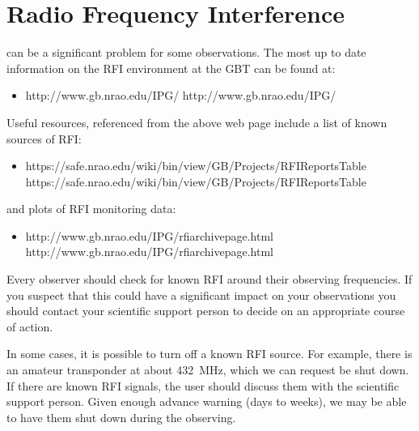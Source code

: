 \chapter{Radio Frequency Interference}\label{chap:rfi}

 can be a significant problem for some observations. The most
up to date information on the \gls{RFI} environment at the \gls{GBT} can be
found at:
\begin{itemize}
\item \htmladdnormallink
{http://www.gb.nrao.edu/IPG/}
{http://www.gb.nrao.edu/IPG/}
\end{itemize}

\noindent Useful resources, referenced from the above web page include
a list of known sources of \gls{RFI}: 
\begin{itemize}
\item \htmladdnormallink
{https://safe.nrao.edu/wiki/bin/view/GB/Projects/RFIReportsTable}
{https://safe.nrao.edu/wiki/bin/view/GB/Projects/RFIReportsTable}
\end{itemize}

\noindent and plots of RFI monitoring data:
\begin{itemize}
\item \htmladdnormallink
{http://www.gb.nrao.edu/IPG/rfiarchivepage.html}
{http://www.gb.nrao.edu/IPG/rfiarchivepage.html}
\end{itemize}

Every observer should check for known \gls{RFI} around their observing frequencies.
If you suspect that this could have a significant impact on your observations
you should contact your scientific support person to decide on an appropriate
course of action.


In some cases, it is possible to turn off a known \gls{RFI} source.
For example, there is an amateur transponder at about 432~MHz, which we can
request be shut down.  If there are known \gls{RFI} signals, the user
should discuss them with the scientific support person.  Given enough advance
warning (days to weeks), we may be able to have them shut down during the
observing.


